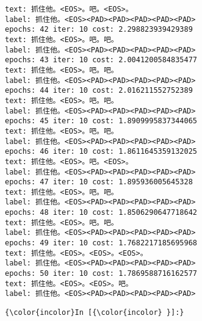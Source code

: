 \documentclass[11pt]{article}
\begin{document}
\begin{Verbatim}[commandchars=\\\{\}]
text: 抓住他。<EOS>。吧。<EOS>。
label: 抓住他。<EOS><PAD><PAD><PAD><PAD><PAD>
epochs: 42 iter: 10 cost: 2.298823939429389
text: 抓住他。<EOS>。吧。吧。
label: 抓住他。<EOS><PAD><PAD><PAD><PAD><PAD>
epochs: 43 iter: 10 cost: 2.0041200584835477
text: 抓住他。<EOS>。吧。吧。
label: 抓住他。<EOS><PAD><PAD><PAD><PAD><PAD>
epochs: 44 iter: 10 cost: 2.016211552752389
text: 抓住他。<EOS>。吧。吧。
label: 抓住他。<EOS><PAD><PAD><PAD><PAD><PAD>
epochs: 45 iter: 10 cost: 1.8909995837344065
text: 抓住他。<EOS>。吧。吧。
label: 抓住他。<EOS><PAD><PAD><PAD><PAD><PAD>
epochs: 46 iter: 10 cost: 1.8611645359132025
text: 抓住他。<EOS>。吧。<EOS>。
label: 抓住他。<EOS><PAD><PAD><PAD><PAD><PAD>
epochs: 47 iter: 10 cost: 1.895936005645328
text: 抓住他。<EOS>。吧。吧。
label: 抓住他。<EOS><PAD><PAD><PAD><PAD><PAD>
epochs: 48 iter: 10 cost: 1.8506290647718642
text: 抓住他。<EOS>。吧。吧。
label: 抓住他。<EOS><PAD><PAD><PAD><PAD><PAD>
epochs: 49 iter: 10 cost: 1.7682217185695968
text: 抓住他。<EOS>。<EOS>。<EOS>。
label: 抓住他。<EOS><PAD><PAD><PAD><PAD><PAD>
epochs: 50 iter: 10 cost: 1.7869588716162577
text: 抓住他。<EOS>。<EOS>。吧。
label: 抓住他。<EOS><PAD><PAD><PAD><PAD><PAD>

    \end{Verbatim}

    \begin{Verbatim}[commandchars=\\\{\}]
{\color{incolor}In [{\color{incolor} }]:} 
\end{Verbatim}



    
    
    
    
\end{document}
